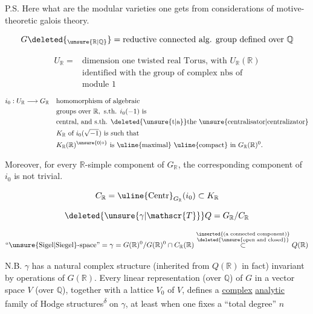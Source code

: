 P.S. Here what are the modular varieties one gets from considerations of motive-theoretic galois theory.

\[
G\deleted{_{\unsure{\mathbb{R}|\mathbb{Q}}}}
= \text{reductive connected alg. group defined over }\mathbb{Q}
\]

\[
\begin{aligned}
U_{\mathbb{R}}={}&\text{dimension one twisted real Torus, with }U_{\mathbb{R}}(\mathbb{R})\\
&\text{identified with the group of complex nbs of}\\
&\text{module }1
\end{aligned}
\]

\[
\begin{aligned}
i_0:U_{\mathbb{R}}\longrightarrow G_{\mathbb{R}}\quad &\text{homomorphism of algebraic}\\
&\text{groups over }\mathbb{R},\ \text{s.th. }i_0(-1)\text{ is}\\
&\text{central, and s.th. \deleted{\unsure{t|a}}the \unsure{centralisator|centralizator}}\\
&K_{\mathbb{R}}\text{ of }i_0(\sqrt{-1})\text{ is such that}\\
&K_{\mathbb{R}}(\mathbb{R})^{\unsure{0|\circ}}\text{ is \uline{maximal} \uline{compact} in }G_{\mathbb{R}}(\mathbb{R})^{0}.
\end{aligned}
\]

Moreover, for every $\mathbb{R}$-simple component of $G_{\mathbb{R}}$, the corresponding component of $i_0$ is not trivial.

\[
C_{\mathbb{R}}=\text{\uline{Centr}}_{G_{\mathbb{R}}}(i_0)\subset K_{\mathbb{R}}
\]

\[
\deleted{\unsure{\gamma|\mathscr{T}}}Q=G_{\mathbb{R}}/C_{\mathbb{R}}
\]

\[
\text{``\unsure{Sigel|Siegel}-space''}=\gamma=G(\mathbb{R})^{0}/G(\mathbb{R})^{0}\cap C_{\mathbb{R}}(\mathbb{R})
\overset{\substack{\inserted{\text{(a connected component)}}\\ \deleted{\text{\unsure{open and closed}}}}}{\subset}Q(\mathbb{R})
\]

N.B. $\gamma$ has a natural complex structure (inherited from  $Q(\mathbb{R})$ in fact) invariant by operations of $G(\mathbb{R})$. Every linear representation (over $\mathbb{Q}$) of $G$ in a vector space $V$ (over $\mathbb{Q}$), together with a lattice $V_0$ of $V$, defines a \uline{complex} \uline{analytic} family  of Hodge structures\textsuperscript{\ensuremath{\delta}} on $\gamma$, at least when one fixes a ``total degree'' $n$
